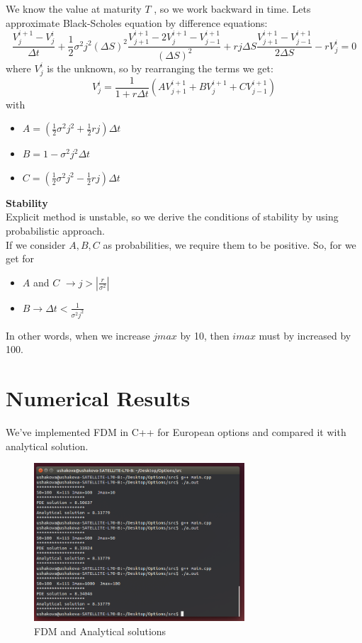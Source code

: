 \documentclass[a4paper]{report}
\begin{document}
\begin{itemize}
\begin{itemize}
We know the value at maturity $T$ , so we work backward in time. Lets approximate Black-Scholes equation by difference equations:
\begin{equation}
\frac{V_j^{i+1}-V_j^i}{\Delta t} + \frac{1}{2} \sigma^2 j^2 (\Delta S)^2 \frac{V_{j+1}^{i+1}-2V_j^{i+1}-V_{j-1}^{i+1}}{(\Delta S)^2} + rj\Delta S \frac{V_{j+1}^{i+1}-V_{j-1}^{i+1}}{2\Delta S} -rV_j^i=0
\end{equation} 
where $V_j^i$ is the unknown, so by rearranging the terms we get:
\begin{equation}
V_j^i = \frac{1}{1+r\Delta t}(AV_{j+1}^{i+1}+BV_j^{i+1}+CV_{j-1}^{i+1})
\end{equation}
with 
\begin{itemize}
\item $A=(\frac{1}{2} \sigma^2 j^2+\frac{1}{2} rj)\Delta t $
\item $B=1-\sigma^2 j^2 \Delta t $
\item $C = (\frac{1}{2} \sigma^2 j^2 - \frac{1}{2}rj)\Delta t$
\end{itemize}


\textbf{Stability}\\
Explicit method is unstable, so we derive the conditions of stability by using probabilistic approach.\\
If we consider $A,B,C$ as probabilities, we require them to be positive. So, for we get for 
\begin{itemize}
\item $A$ and $C$ $\rightarrow  j > |\frac{r}{\sigma^2}|$  
\item $B \rightarrow \Delta t < \frac{1}{\sigma^2 j^2}$
\end{itemize} 
In other words, when we increase $jmax$ by 10, then $imax$ must by increased by 100.

\section{Numerical Results}
We've implemented FDM in C++ for European options and compared it with analytical solution.
\begin{figure}[H]
   \includegraphics[width=0.7\textwidth]{fdm.png}
    \caption{ FDM and Analytical solutions}
\end{figure}


\end{itemize}
\end{itemize}
\end{document}
